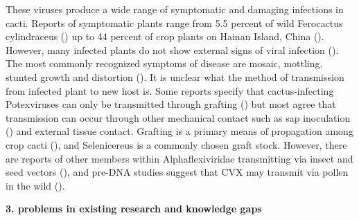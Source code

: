 \documentclass{article}
\begin{document}
These viruses produce a wide range of symptomatic and damaging infections in cacti. Reports of symptomatic plants range from 5.5 percent of wild Ferocactus cylindraceus (\cite{attathom_occurrence_1978}) up to 44 percent of crop plants on Hainan Island, China (\cite{peng_molecular_2016}). However, many infected plants do not show external signs of viral infection (\cite{liou_complete_2004, bos_symptoms_nodate}). The most commonly recognized symptoms of disease are mosaic, mottling, stunted growth and distortion (\cite{maliarenko_cactus_2013, peng_molecular_2016, attathom_occurrence_1978}). It is unclear what the method of transmission from infected plant to new host is. Some reports specify that cactus-infecting Potexviruses can only be transmitted through grafting (\cite{duarte_potexvirus_2008, martelli_family_2007}) but most agree that transmission can occur through other mechanical contact such as sap inoculation (\cite{liou_complete_2004, maliarenko_cactus_2013, park_detection_2018}) and external tissue contact. Grafting is a primary means of propagation among crop cacti (\cite{park_detection_2018}), and Selenicereus is a commonly chosen graft stock. However, there are reports of other members within Alphaflexiviridae transmitting via insect and seed vectors (\cite{martelli_family_2007}), and pre-DNA studies suggest that CVX may transmit via pollen in the wild (\cite{attathom_occurrence_1978}).

    
\textbf{3. problems in existing research and knowledge gaps}
\end{document}
